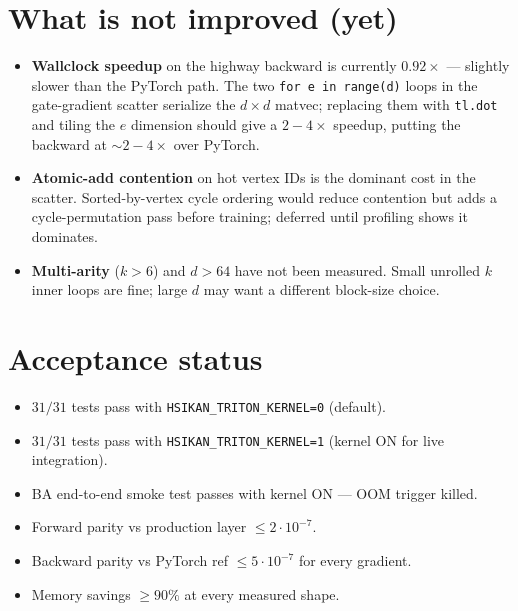 \documentclass[11pt,a4paper]{article}
\begin{document}
\section{What is not improved (yet)}

\begin{itemize}[leftmargin=*]
  \item \textbf{Wallclock speedup} on the highway backward is currently $0.92\times$ ---  slightly slower than the PyTorch path. The two \texttt{for e in range(d)} loops in the gate-gradient scatter serialize the $d{\times}d$ matvec; replacing them with \texttt{tl.dot} and tiling the $e$ dimension should give a $2{-}4\times$ speedup, putting the backward at $\sim 2{-}4\times$ over PyTorch.
  \item \textbf{Atomic-add contention} on hot vertex IDs is the dominant cost in the scatter. Sorted-by-vertex cycle ordering would reduce contention but adds a cycle-permutation pass before training; deferred until profiling shows it dominates.
  \item \textbf{Multi-arity} ($k > 6$) and \textbf{$d > 64$} have not been measured. Small unrolled $k$ inner loops are fine; large $d$ may want a different block-size choice.
\end{itemize}

\section{Acceptance status}

\begin{itemize}[leftmargin=*]
  \item[$\checkmark$] $31 / 31$ tests pass with \texttt{HSIKAN\_TRITON\_KERNEL=0} (default).
  \item[$\checkmark$] $31 / 31$ tests pass with \texttt{HSIKAN\_TRITON\_KERNEL=1} (kernel ON for live integration).
  \item[$\checkmark$] BA end-to-end smoke test passes with kernel ON --- OOM trigger killed.
  \item[$\checkmark$] Forward parity vs production layer $\le 2 \cdot 10^{-7}$.
  \item[$\checkmark$] Backward parity vs PyTorch ref $\le 5 \cdot 10^{-7}$ for every gradient.
  \item[$\checkmark$] Memory savings $\ge 90\%$ at every measured shape.
\end{itemize}
\end{document}

